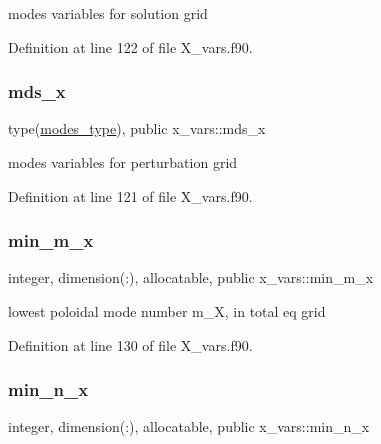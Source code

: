 modes variables for solution grid 



Definition at line 122 of file X\+\_\+vars.\+f90.

\mbox{\label{namespacex__vars_a690d4228d2a81ec5a7a6cd13be3a56a1}} 
\subsubsection{\texorpdfstring{mds\+\_\+x}{mds\_x}}
{\footnotesize\ttfamily type(\hyperlink{structx__vars_1_1modes__type}{modes\+\_\+type}), public x\+\_\+vars\+::mds\+\_\+x}



modes variables for perturbation grid 



Definition at line 121 of file X\+\_\+vars.\+f90.

\mbox{\label{namespacex__vars_aae62c7b4f8043dcccad97454b5857690}} 
\subsubsection{\texorpdfstring{min\+\_\+m\+\_\+x}{min\_m\_x}}
{\footnotesize\ttfamily integer, dimension(\+:), allocatable, public x\+\_\+vars\+::min\+\_\+m\+\_\+x}



lowest poloidal mode number {\ttfamily m\+\_\+X}, in total eq grid 



Definition at line 130 of file X\+\_\+vars.\+f90.

\mbox{\label{namespacex__vars_a07485e5ebf54c236ae6f3c25e9cd2a93}} 
\subsubsection{\texorpdfstring{min\+\_\+n\+\_\+x}{min\_n\_x}}
{\footnotesize\ttfamily integer, dimension(\+:), allocatable, public x\+\_\+vars\+::min\+\_\+n\+\_\+x}



